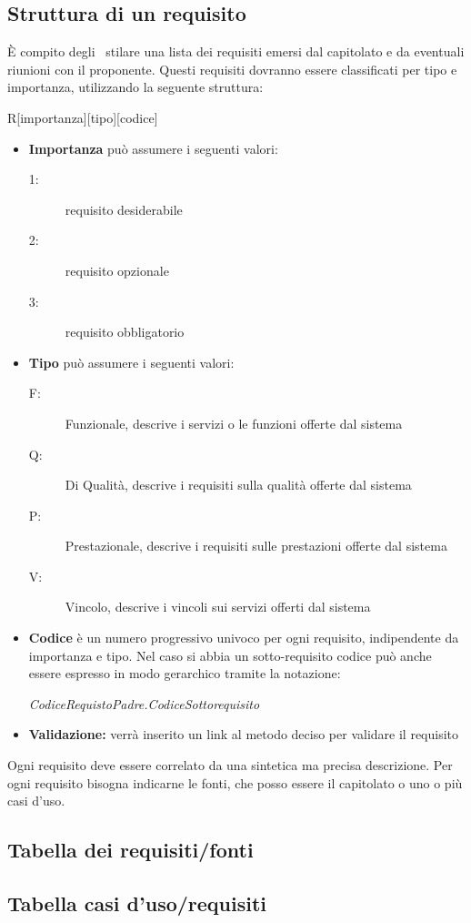 \documentclass[12pt,a4paper]{article}
\begin{document}
\subsection{Struttura di un requisito}
È compito degli \ANpl\ stilare una lista dei requisiti emersi dal capitolato e da eventuali riunioni con il proponente. Questi requisiti dovranno essere classificati per tipo e importanza, utilizzando la seguente struttura:
\begin{center}
	R[importanza][tipo][codice]
\end{center}
\begin{itemize}
	\item \textbf{Importanza} può assumere i seguenti valori:
	\begin{description}
		\item[1:] requisito desiderabile
		\item[2:] requisito opzionale
		\item[3:] requisito obbligatorio
	\end{description}
	\item \textbf{Tipo} può assumere i seguenti valori:
	\begin{description}
		\item[F:] Funzionale, descrive i servizi o le funzioni offerte dal sistema
		\item[Q:] Di Qualità, descrive i requisiti sulla qualità offerte dal sistema
		\item[P:] Prestazionale, descrive i requisiti sulle prestazioni offerte dal sistema
		\item[V:] Vincolo, descrive i vincoli sui servizi offerti dal sistema
	\end{description}
	\item \textbf{Codice} è un numero progressivo univoco per ogni requisito, indipendente da importanza e tipo. Nel caso si abbia un sotto-requisito codice può anche essere espresso in modo gerarchico tramite la notazione:
	\begin{center}
		\textit{CodiceRequistoPadre.CodiceSottorequisito}
	\end{center}
	\item \textbf{Validazione:} verrà inserito un link al metodo deciso per validare il requisito
\end{itemize}
Ogni requisito deve essere correlato da una sintetica ma precisa descrizione. Per ogni requisito bisogna indicarne le fonti, che posso essere il capitolato o uno o più casi d'uso.
\newpage
\subsection{Tabella dei requisiti/fonti}



\newpage
\subsection{Tabella casi d'uso/requisiti}


\end{document}
